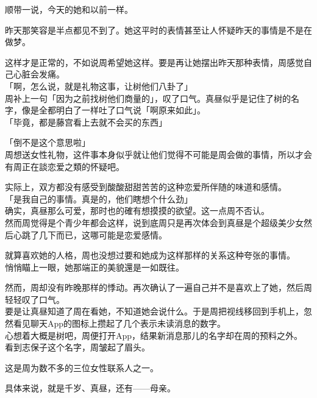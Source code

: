 顺带一说，今天的她和以前一样。

昨天那笑容是半点都见不到了。她这平时的表情甚至让人怀疑昨天的事情是不是在做梦。

这样才是正常的，不如说周希望她这样。要是再让她摆出昨天那种表情，周感觉自己心脏会发痛。\\

「啊，怎么说，就是礼物这事，让树他们八卦了」\\

周补上一句「因为之前找树他们商量的」，叹了口气。真昼似乎是记住了树的名字，像是全都明白了一样吐了口气说「啊原来如此」。\\

「毕竟，都是藤宫看上去就不会买的东西」

「倒不是这个意思啦」\\

周想送女性礼物，这件事本身似乎就让他们觉得不可能是周会做的事情，所以才会有周正在談恋爱之類的怀疑吧。

实际上，双方都没有感受到酸酸甜甜苦苦的这种恋爱所伴随的味道和感情。\\

「是我自己的事情。真是的，他们瞎想个什么劲」\\

确实，真昼那么可爱，那时也的確有想摸摸的欲望。这一点周不否认。\\

然而周觉得是个青少年都会这样，说到底周只是再次体会到真昼是个超级美少女然后心跳了几下而已，这哪可能是恋爱感情。

就算喜欢她的人格，周也没想过要和她成为这样那样的关系这种夸张的事情。\\

悄悄瞄上一眼，她那端正的美貌還是一如既往。

然而，周却没有昨晚那样的悸动。再次确认了一遍自己并不是喜欢上了她，然后周轻轻叹了口气。\\

要是让真昼知道了周在看她，不知道她会说什么。于是周把视线移回到手机上，忽然看见聊天App的图标上攒起了几个表示未读消息的数字。\\

心想着大概是树吧，周便打开App，结果新消息那儿的名字却在周的预料之外。\\

看到志保子这个名字，周皱起了眉头。

这是周为数不多的三位女性联系人之一。

具体来说，就是千岁、真昼，还有——母亲。\\

